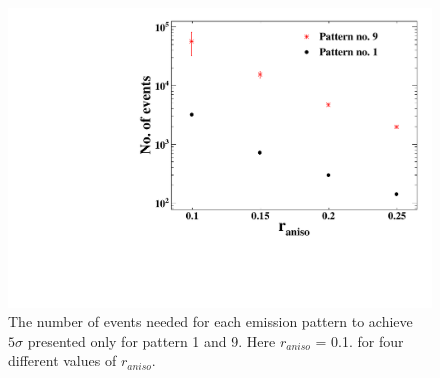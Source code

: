 \begin{figure}[h]
\centering
\includegraphics[width=0.45\linewidth]{ConvergenceVsRaniso.pdf}
\caption{The number of events needed for each emission pattern to achieve $5\sigma$ presented only for pattern 1 and 9. Here 
$r_{aniso}$ = 0.1. for four different values of $r_{aniso}$.}
\label{fig:convergence}
\end{figure}


